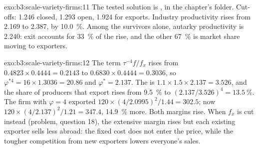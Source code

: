 \begin{solution}{exo:b3:scale-variety-firms:11}
The tested solution is , in the chapter's
 folder. Cut-offs: 1.246 closed, 1.293 open, 1.924 for exports.
Industry productivity rises from 2.169 to 2.387, by 10.0~\%. Among the survivors
alone, autarky productivity is 2.240: exit accounts for 33~\% of the rise, and the
other 67~\% is market share moving to exporters. %
\end{solution}

\begin{solution}{exo:b3:scale-variety-firms:12}
The term $\tau^{-4}f/f_x$ rises from $0.4823 \times 0.4444 = 0.2143$ to $0.6830 \times 0.4444
= 0.3036$, so $\varphi^{*4} = 16 \times 1.3036 = 20.86$ and $\varphi^* = 2.137$. The 
is $1.1 \times 1.5 \times 2.137 = 3.526$, and the share of producers that export rises from
9.5~\% to $(2.137/3.526)^4 = 13.5~\%$. The firm with $\varphi = 4$ exported $120 \times
(4/2.0995)^2/1.44 = 302.5$; now $120 \times (4/2.137)^2/1.21 = 347.4$, 14.9~\% more. Both
margins rise. When $f_x$ is cut instead (problem, question 18), the extensive
margin rises but each existing exporter sells less abroad: the fixed cost does
not enter the price, while the tougher competition from new exporters lowers
everyone's sales.
\end{solution}


